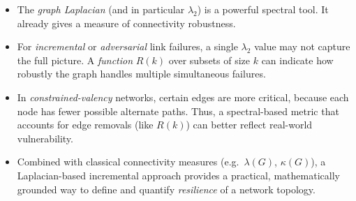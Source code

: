 \begin{itemize}
\item The \emph{graph Laplacian} (and in particular $\lambda_2$) is a powerful spectral tool. It already gives a measure of connectivity robustness.
\item For \emph{incremental} or \emph{adversarial} link failures, a single $\lambda_2$ value may not capture the full picture. A \emph{function} $R(k)$ over subsets of size $k$ can indicate how robustly the graph handles multiple simultaneous failures.
\item In \emph{constrained-valency} networks, certain edges are more critical, because each node has fewer possible alternate paths. Thus, a spectral-based metric that accounts for edge removals (like $R(k)$) can better reflect real-world vulnerability.
\item Combined with classical connectivity measures (e.g.\ $\lambda(G)$, $\kappa(G)$), a Laplacian-based incremental approach provides a practical, mathematically grounded way to define and quantify \emph{resilience} of a network topology.
\end{itemize}